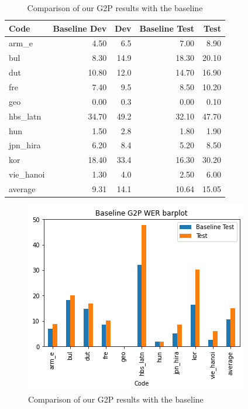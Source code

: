 \documentclass[11pt,a4paper]{article}
\begin{document}
\begin{table}[h]
\centering
\begin{tabular}{lrrrr}
\toprule
      Code &  Baseline Dev &   Dev &  Baseline Test &   Test \\
\midrule
     arm\_e &          4.50 &   6.5 &           7.00 &   8.90 \\
       bul &          8.30 &  14.9 &          18.30 &  20.10 \\
       dut &         10.80 &  12.0 &          14.70 &  16.90 \\
       fre &          7.40 &   9.5 &           8.50 &  10.20 \\
       geo &          0.00 &   0.3 &           0.00 &   0.10 \\
  hbs\_latn &         34.70 &  49.2 &          32.10 &  47.70 \\
       hun &          1.50 &   2.8 &           1.80 &   1.90 \\
  jpn\_hira &          6.20 &   8.4 &           5.20 &   8.50 \\
       kor &         18.40 &  33.4 &          16.30 &  30.20 \\
 vie\_hanoi &          1.30 &   4.0 &           2.50 &   6.00 \\
\midrule
   average &          9.31 &  14.1 &          10.64 &  15.05 \\
\bottomrule
\end{tabular}
\caption{Comparison of our G2P results with the baseline}
\label{tab:baseline}
\end{table}

\begin{figure}[h]
    \centering
    \includegraphics[width=\linewidth]{g2p_baseline.png}
    \caption{Comparison of our G2P results with the baseline}
    \label{fig:baseline}
\end{figure}
\end{document}
